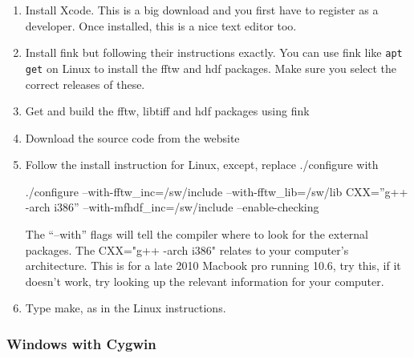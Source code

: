 \documentclass[]{cxs-software}
\begin{document}
\begin{enumerate}
\item Install Xcode\cite{}. This is a big download and you first have
  to register as a developer. Once installed, this is a nice text
  editor too.
\item Install fink\cite{} but following their instructions exactly.
  You can use fink like {\tt apt get} on Linux to install the fftw and
  hdf packages. Make sure you select the correct releases of these.
\item Get and build the fftw, libtiff and hdf packages using fink
\item Download the \name source code from the website
\item Follow the install instruction for Linux, except, replace ./configure with 
\begin{myverbatim}
  ./configure --with-fftw_inc=/sw/include --with-fftw_lib=/sw/lib CXX=''g++ -arch i386'' --with-mfhdf_inc=/sw/include --enable-checking
\end{myverbatim}
The ``--with'' flags will tell the compiler where to look for the
external packages.  The CXX="g++ -arch i386" relates to your
computer's architecture. This is for a late 2010 Macbook pro running
10.6, try this, if it doesn't work, try looking up the relevant
information for your computer. %
\item Type make, as in the Linux instructions.
\end{enumerate}

\subsubsection{Windows with Cygwin}
\end{document}

